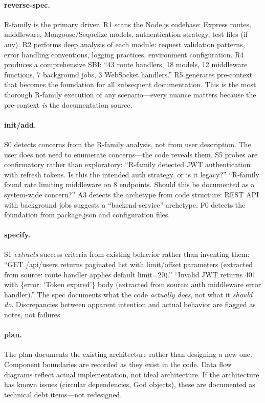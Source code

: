 \documentclass[11pt,a4paper,openright,twoside]{report}
\begin{document}
\paragraph{reverse-spec.}
R-family is the primary driver. R1 scans the Node.js codebase: Express routes, middleware, Mongoose/Sequelize models, authentication strategy, test files (if any). R2 performs deep analysis of each module: request validation patterns, error handling conventions, logging practices, environment configuration. R4 produces a comprehensive SBI: ``43 route handlers, 18 models, 12 middleware functions, 7 background jobs, 3 WebSocket handlers.'' R5 generates pre-context that becomes the foundation for all subsequent documentation. This is the most thorough R-family execution of any scenario---every nuance matters because the pre-context \emph{is} the documentation source.

\paragraph{init/add.}
S0 detects concerns from the R-family analysis, not from user description. The user does not need to enumerate concerns---the code reveals them. S5 probes are confirmatory rather than exploratory: ``R-family detected JWT authentication with refresh tokens. Is this the intended auth strategy, or is it legacy?'' ``R-family found rate limiting middleware on 8 endpoints. Should this be documented as a system-wide concern?'' A3 detects the archetype from code structure: REST API with background jobs suggests a ``backend-service'' archetype. F0 detects the foundation from package.json and configuration files.

\paragraph{specify.}
S1 \emph{extracts} success criteria from existing behavior rather than inventing them: ``GET /api/users returns paginated list with limit/offset parameters (extracted from source: route handler applies default limit=20).'' ``Invalid JWT returns 401 with \{error: `Token expired'\} body (extracted from source: auth middleware error handler).'' The spec documents what the code \emph{actually does}, not what it \emph{should do}. Discrepancies between apparent intention and actual behavior are flagged as notes, not failures.

\paragraph{plan.}
The plan documents the existing architecture rather than designing a new one. Component boundaries are recorded as they exist in the code. Data flow diagrams reflect actual implementation, not ideal architecture. If the architecture has known issues (circular dependencies, God objects), these are documented as technical debt items---not redesigned.
\end{document}
